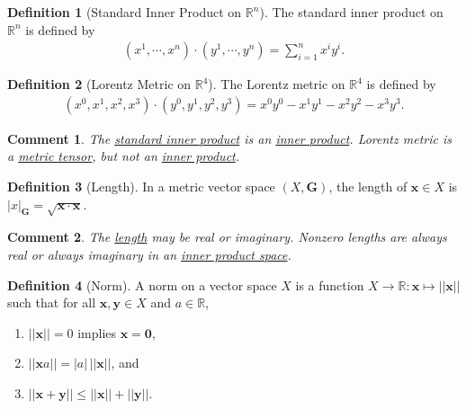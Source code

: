 \documentclass[letterpaper,12pt]{article}
\theoremstyle{plain}
\theoremstyle{plain}
\newtheorem*{cmnt*}{Comment}
\theoremstyle{definition}
\newtheorem{defn}{Definition}
\begin{document}
\begin{defn}[Standard Inner Product on $\mathbb{R}^n$]\label{defsip}
The standard inner product on $\mathbb{R}^n$ is defined by
\begin{align*}
(x^1,\cdots,x^n)\cdot(y^1,\cdots,y^n)=\sum_{i=1}^n x^iy^i.
\end{align*}
\end{defn}

\begin{defn}[Lorentz Metric on $\mathbb{R}^4$]\label{defLmet}
The Lorentz metric on $\mathbb{R}^4$ is defined by
\begin{align*}
(x^0,x^1,x^2,x^3)\cdot(y^0,y^1,y^2,y^3)= x^0y^0 - x^1y^1 - x^2y^2 - x^3y^3.
\end{align*}
\end{defn}

\begin{cmnt*}
The \hyperref[defsip]{standard inner product} is an \hyperref[definnpdt]{inner product}. Lorentz metric is a \hyperref[defmettns]{metric tensor}, but not an \hyperref[definnpdt]{inner product}.
\end{cmnt*}

\begin{defn}[Length]\label{deflen}
In a metric vector space $(X,\mathbf{G})$, the length of $\mathbf{x}\in X$ is $|x|_{\mathbf{G}}=\sqrt{\mathbf{x}\cdot\mathbf{x}}$.
\end{defn}

\begin{cmnt*}
The \hyperref[deflen]{length} may be real or imaginary. Nonzero lengths are always real or always imaginary in an \hyperref[definpsp]{inner product space}.
\end{cmnt*}

\begin{defn}[Norm]\label{defnorm}
A norm on a vector space $X$ is a function $X\rightarrow \mathbb{R}: \mathbf{x} \mapsto ||\mathbf{x}||$ such that for all $\mathbf{x},\mathbf{y} \in X$ and $a \in \mathbb{R}$,
\begin{enumerate}
\item $||\mathbf{x}||=0$ implies $\mathbf{x}=\mathbf{0}$,
\item $||\mathbf{x}a||=|a|\,||\mathbf{x}||$, and
\item $||\mathbf{x+y}|| \le ||\mathbf{x}|| + ||\mathbf{y}||$.
\end{enumerate}
\end{defn}
\end{document}
